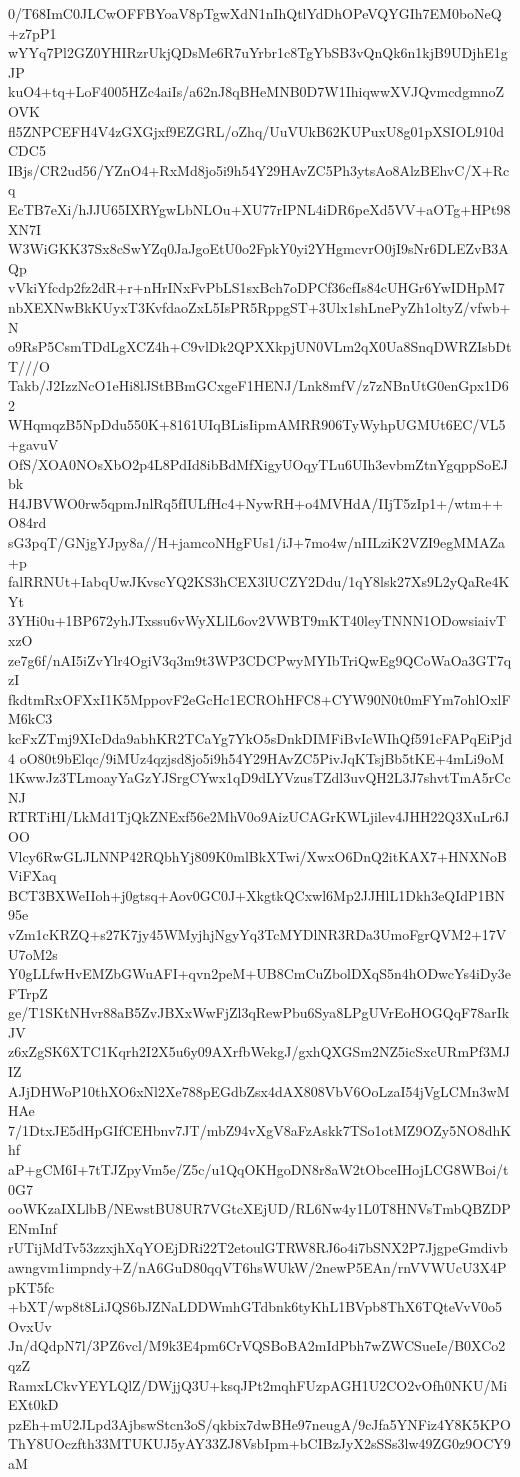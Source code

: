 0/T68ImC0JLCwOFFBYoaV8pTgwXdN1nIhQtlYdDhOPeVQYGIh7EM0boNeQ+z7pP1
wYYq7Pl2GZ0YHIRzrUkjQDsMe6R7uYrbr1c8TgYbSB3vQnQk6n1kjB9UDjhE1gJP
kuO4+tq+LoF4005HZc4aiIs/a62nJ8qBHeMNB0D7W1IhiqwwXVJQvmcdgmnoZOVK
fl5ZNPCEFH4V4zGXGjxf9EZGRL/oZhq/UuVUkB62KUPuxU8g01pXSIOL910dCDC5
IBjs/CR2ud56/YZnO4+RxMd8jo5i9h54Y29HAvZC5Ph3ytsAo8AlzBEhvC/X+Rcq
EcTB7eXi/hJJU65IXRYgwLbNLOu+XU77rIPNL4iDR6peXd5VV+aOTg+HPt98XN7I
W3WiGKK37Sx8cSwYZq0JaJgoEtU0o2FpkY0yi2YHgmcvrO0jI9sNr6DLEZvB3AQp
vVkiYfcdp2fz2dR+r+nHrINxFvPbLS1sxBch7oDPCf36cfIs84cUHGr6YwIDHpM7
nbXEXNwBkKUyxT3KvfdaoZxL5IsPR5RppgST+3Ulx1shLnePyZh1oltyZ/vfwb+N
o9RsP5CsmTDdLgXCZ4h+C9vlDk2QPXXkpjUN0VLm2qX0Ua8SnqDWRZIsbDtT///O
Takb/J2IzzNcO1eHi8lJStBBmGCxgeF1HENJ/Lnk8mfV/z7zNBnUtG0enGpx1D62
WHqmqzB5NpDdu550K+8161UIqBLisIipmAMRR906TyWyhpUGMUt6EC/VL5+gavuV
OfS/XOA0NOsXbO2p4L8PdId8ibBdMfXigyUOqyTLu6UIh3evbmZtnYgqppSoEJbk
H4JBVWO0rw5qpmJnlRq5fIULfHc4+NywRH+o4MVHdA/IIjT5zIp1+/wtm++O84rd
sG3pqT/GNjgYJpy8a//H+jamcoNHgFUs1/iJ+7mo4w/nIILziK2VZI9egMMAZa+p
falRRNUt+IabqUwJKvscYQ2KS3hCEX3lUCZY2Ddu/1qY8lsk27Xs9L2yQaRe4KYt
3YHi0u+1BP672yhJTxssu6vWyXLlL6ov2VWBT9mKT40leyTNNN1ODowsiaivTxzO
ze7g6f/nAI5iZvYlr4OgiV3q3m9t3WP3CDCPwyMYIbTriQwEg9QCoWaOa3GT7qzI
fkdtmRxOFXxI1K5MppovF2eGcHc1ECROhHFC8+CYW90N0t0mFYm7ohlOxlFM6kC3
kcFxZTmj9XIcDda9abhKR2TCaYg7YkO5sDnkDIMFiBvIcWIhQf591cFAPqEiPjd4
oO80t9bElqc/9iMUz4qzjsd8jo5i9h54Y29HAvZC5PivJqKTsjBb5tKE+4mLi9oM
1KwwJz3TLmoayYaGzYJSrgCYwx1qD9dLYVzusTZdl3uvQH2L3J7shvtTmA5rCcNJ
RTRTiHI/LkMd1TjQkZNExf56e2MhV0o9AizUCAGrKWLjilev4JHH22Q3XuLr6JOO
Vlcy6RwGLJLNNP42RQbhYj809K0mlBkXTwi/XwxO6DnQ2itKAX7+HNXNoBViFXaq
BCT3BXWeIIoh+j0gtsq+Aov0GC0J+XkgtkQCxwl6Mp2JJHlL1Dkh3eQIdP1BN95e
vZm1cKRZQ+s27K7jy45WMyjhjNgyYq3TcMYDlNR3RDa3UmoFgrQVM2+17VU7oM2s
Y0gLLfwHvEMZbGWuAFI+qvn2peM+UB8CmCuZbolDXqS5n4hODwcYs4iDy3eFTrpZ
ge/T1SKtNHvr88aB5ZvJBXxWwFjZl3qRewPbu6Sya8LPgUVrEoHOGQqF78arIkJV
z6xZgSK6XTC1Kqrh2I2X5u6y09AXrfbWekgJ/gxhQXGSm2NZ5icSxcURmPf3MJIZ
AJjDHWoP10thXO6xNl2Xe788pEGdbZsx4dAX808VbV6OoLzaI54jVgLCMn3wMHAe
7/1DtxJE5dHpGIfCEHbnv7JT/mbZ94vXgV8aFzAskk7TSo1otMZ9OZy5NO8dhKhf
aP+gCM6I+7tTJZpyVm5e/Z5c/u1QqOKHgoDN8r8aW2tObceIHojLCG8WBoi/t0G7
ooWKzaIXLlbB/NEwstBU8UR7VGtcXEjUD/RL6Nw4y1L0T8HNVsTmbQBZDPENmInf
rUTijMdTv53zzxjhXqYOEjDRi22T2etoulGTRW8RJ6o4i7bSNX2P7JjgpeGmdivb
awngvm1impndy+Z/nA6GuD80qqVT6hsWUkW/2newP5EAn/rnVVWUcU3X4PpKT5fc
+bXT/wp8t8LiJQS6bJZNaLDDWmhGTdbnk6tyKhL1BVpb8ThX6TQteVvV0o5OvxUv
Jn/dQdpN7l/3PZ6vcl/M9k3E4pm6CrVQSBoBA2mIdPbh7wZWCSueIe/B0XCo2qzZ
RamxLCkvYEYLQlZ/DWjjQ3U+ksqJPt2mqhFUzpAGH1U2CO2vOfh0NKU/MiEXt0kD
pzEh+mU2JLpd3AjbswStcn3oS/qkbix7dwBHe97neugA/9cJfa5YNFiz4Y8K5KPO
ThY8UOczfth33MTUKUJ5yAY33ZJ8VsbIpm+bCIBzJyX2sSSs3lw49ZG0z9OCY9aM
